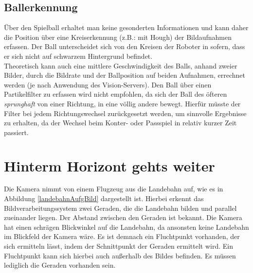 \documentclass{ezb}
\begin{document}
\subsection{Ballerkennung}
Über den Spielball erhaltet man keine gesonderten Informationen und kann daher die Position über eine Kreiserkennung (z.B.: mit Hough) der Bildaufnahmen erfassen. Der Ball unterscheidet sich von den Kreisen der Roboter in sofern, dass er sich nicht auf schwarzem Hintergrund befindet.\\
\linebreak
Theoretisch kann auch eine mittlere Geschwindigkeit des Balls, anhand zweier Bilder, durch die Bildrate und der Ballposition auf beiden Aufnahmen, errechnet werden (je nach Anwendung des Vision-Servers). Den Ball über einen Partikelfilter zu erfassen wird nicht empfohlen, da sich der Ball des öfteren \textit{sprunghaft} von einer Richtung, in eine völlig andere bewegt. Hierfür müsste der Filter bei jedem Richtungswechsel zurückgesetzt werden, um sinnvolle Ergebnisse zu erhalten, da der Wechsel beim Konter- oder Passspiel in relativ kurzer Zeit passiert.
\section{Hinterm Horizont gehts weiter}
Die Kamera nimmt von einem Flugzeug aus die Landebahn auf, wie es in Abbildung \ref{landebahnAufgBild} dargestellt ist. Hierbei erkennt das Bildverarbeitungssystem zwei Geraden, die die Landebahn bilden und parallel zueinander liegen. Der Abstand zwischen den Geraden ist bekannt. Die Kamera hat einen schrägen Blickwinkel auf die Landebahn, da ansonsten keine Landebahn im Blickfeld der Kamera wäre. Es ist demnach ein Fluchtpunkt vorhanden, der sich ermitteln lässt, indem der Schnittpunkt der Geraden ermittelt wird. Ein Fluchtpunkt kann sich hierbei auch außerhalb des Bildes befinden. Es müssen lediglich die Geraden vorhanden sein.
\end{document}

